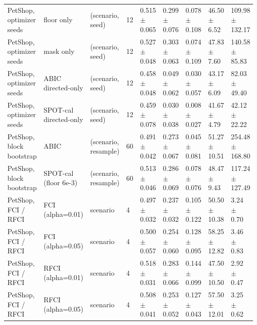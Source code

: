 \begin{table}[t]
\begin{tabular}{@{}lllllllll@{}}
PetShop, optimizer seeds & floor only & (scenario, seed) & 12 & 0.515 $\pm$ 0.065 & 0.299 $\pm$ 0.076 & 0.078 $\pm$ 0.108 & 46.50 $\pm$ 6.52 & 109.98 $\pm$ 132.17\\
PetShop, optimizer seeds & mask only & (scenario, seed) & 12 & 0.527 $\pm$ 0.048 & 0.303 $\pm$ 0.063 & 0.074 $\pm$ 0.109 & 47.83 $\pm$ 7.60 & 140.58 $\pm$ 85.83\\
PetShop, optimizer seeds & ABIC directed-only & (scenario, seed) & 12 & 0.458 $\pm$ 0.048 & 0.049 $\pm$ 0.062 & 0.030 $\pm$ 0.057 & 43.17 $\pm$ 6.09 & 82.03 $\pm$ 49.40\\
PetShop, optimizer seeds & SPOT-cal directed-only & (scenario, seed) & 12 & 0.459 $\pm$ 0.078 & 0.030 $\pm$ 0.038 & 0.008 $\pm$ 0.027 & 41.67 $\pm$ 4.79 & 42.12 $\pm$ 22.22\\
PetShop, block bootstrap & ABIC & (scenario, resample) & 60 & 0.491 $\pm$ 0.042 & 0.273 $\pm$ 0.067 & 0.045 $\pm$ 0.081 & 51.27 $\pm$ 10.51 & 254.48 $\pm$ 168.80\\
PetShop, block bootstrap & SPOT-cal (floor 6e-3) & (scenario, resample) & 60 & 0.513 $\pm$ 0.046 & 0.286 $\pm$ 0.069 & 0.078 $\pm$ 0.076 & 48.47 $\pm$ 9.43 & 117.24 $\pm$ 127.49\\
PetShop, FCI / RFCI & FCI (alpha=0.01) & scenario & 4 & 0.497 $\pm$ 0.032 & 0.237 $\pm$ 0.032 & 0.105 $\pm$ 0.122 & 50.50 $\pm$ 10.38 & 3.24 $\pm$ 0.70\\
PetShop, FCI / RFCI & FCI (alpha=0.05) & scenario & 4 & 0.500 $\pm$ 0.057 & 0.254 $\pm$ 0.060 & 0.128 $\pm$ 0.095 & 58.25 $\pm$ 12.82 & 3.46 $\pm$ 0.83\\
PetShop, FCI / RFCI & RFCI (alpha=0.01) & scenario & 4 & 0.518 $\pm$ 0.031 & 0.283 $\pm$ 0.066 & 0.144 $\pm$ 0.099 & 47.50 $\pm$ 10.50 & 2.92 $\pm$ 0.47\\
PetShop, FCI / RFCI & RFCI (alpha=0.05) & scenario & 4 & 0.508 $\pm$ 0.041 & 0.253 $\pm$ 0.052 & 0.127 $\pm$ 0.043 & 57.50 $\pm$ 12.01 & 3.25 $\pm$ 0.62\\
\bottomrule
\end{tabular}
\end{table}
